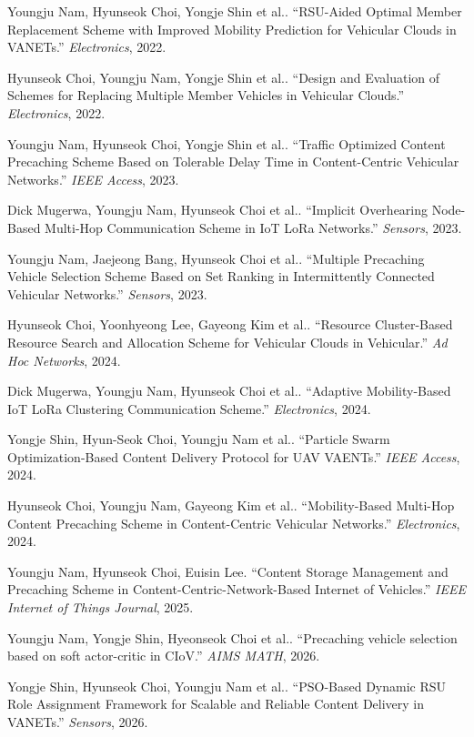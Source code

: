 \documentclass{article}
\begin{document}
Youngju Nam, Hyunseok Choi, Yongje Shin et al.. ``RSU-Aided Optimal Member Replacement Scheme with Improved Mobility Prediction for Vehicular Clouds in VANETs.'' 
\textit{Electronics}, 2022.

Hyunseok Choi, Youngju Nam, Yongje Shin et al.. ``Design and Evaluation of Schemes for Replacing Multiple Member Vehicles in Vehicular Clouds.'' 
\textit{Electronics}, 2022.

Youngju Nam, Hyunseok Choi, Yongje Shin et al.. ``Traffic Optimized Content Precaching Scheme Based on Tolerable Delay Time in Content-Centric Vehicular Networks.'' 
\textit{IEEE Access}, 2023.

Dick Mugerwa, Youngju Nam, Hyunseok Choi et al.. ``Implicit Overhearing Node-Based Multi-Hop Communication Scheme in IoT LoRa Networks.'' 
\textit{Sensors}, 2023.

Youngju Nam, Jaejeong Bang, Hyunseok Choi et al.. ``Multiple Precaching Vehicle Selection Scheme Based on Set Ranking in Intermittently Connected Vehicular Networks.'' 
\textit{Sensors}, 2023.

Hyunseok Choi, Yoonhyeong Lee, Gayeong Kim et al.. ``Resource Cluster-Based Resource Search and Allocation Scheme for Vehicular Clouds in Vehicular.'' 
\textit{Ad Hoc Networks}, 2024.

Dick Mugerwa, Youngju Nam, Hyunseok Choi et al.. ``Adaptive Mobility-Based IoT LoRa Clustering Communication Scheme.'' 
\textit{Electronics}, 2024.

Yongje Shin, Hyun-Seok Choi, Youngju Nam et al.. ``Particle Swarm Optimization-Based Content Delivery Protocol for UAV VAENTs.'' 
\textit{IEEE Access}, 2024.

Hyunseok Choi, Youngju Nam, Gayeong Kim et al.. ``Mobility-Based Multi-Hop Content Precaching Scheme in Content-Centric Vehicular Networks.'' 
\textit{Electronics}, 2024.

Youngju Nam, Hyunseok Choi, Euisin Lee. ``Content Storage Management and Precaching Scheme in Content-Centric-Network-Based Internet of Vehicles.'' 
\textit{IEEE Internet of Things Journal}, 2025.

Youngju Nam, Yongje Shin, Hyeonseok Choi et al.. ``Precaching vehicle selection based on soft actor-critic in CIoV.'' 
\textit{AIMS MATH}, 2026.

Yongje Shin, Hyunseok Choi, Youngju Nam et al.. ``PSO-Based Dynamic RSU Role Assignment Framework for Scalable and Reliable Content Delivery in VANETs.'' 
\textit{Sensors}, 2026.
\end{document}
